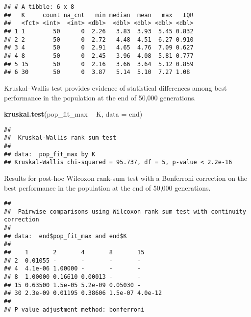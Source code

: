 \documentclass[]{book}
\newenvironment{Shaded}{\begin{snugshade}}{\end{snugshade}}
\newcommand{\DataTypeTok}[1]{\textcolor[rgb]{0.13,0.29,0.53}{#1}}
\newcommand{\KeywordTok}[1]{\textcolor[rgb]{0.13,0.29,0.53}{\textbf{#1}}}
\newcommand{\NormalTok}[1]{#1}
\newcommand{\OperatorTok}[1]{\textcolor[rgb]{0.81,0.36,0.00}{\textbf{#1}}}
\newcommand{\OtherTok}[1]{\textcolor[rgb]{0.56,0.35,0.01}{#1}}
\newcommand{\StringTok}[1]{\textcolor[rgb]{0.31,0.60,0.02}{#1}}
\begin{document}
\begin{verbatim}
## # A tibble: 6 x 8
##   K     count na_cnt   min median  mean   max   IQR
##   <fct> <int>  <int> <dbl>  <dbl> <dbl> <dbl> <dbl>
## 1 1        50      0  2.26   3.83  3.93  5.45 0.832
## 2 2        50      0  2.72   4.48  4.51  6.27 0.910
## 3 4        50      0  2.91   4.65  4.76  7.09 0.627
## 4 8        50      0  2.45   3.96  4.08  5.81 0.777
## 5 15       50      0  2.16   3.66  3.64  5.12 0.859
## 6 30       50      0  3.87   5.14  5.10  7.27 1.08
\end{verbatim}

Kruskal--Wallis test provides evidence of statistical differences among best performance in the population at the end of 50,000 generations.

\begin{Shaded}
\begin{Highlighting}[]
\KeywordTok{kruskal.test}\NormalTok{(pop_fit_max }\OperatorTok{~}\StringTok{ }\NormalTok{K, }\DataTypeTok{data =}\NormalTok{ end)}
\end{Highlighting}
\end{Shaded}

\begin{verbatim}
## 
##  Kruskal-Wallis rank sum test
## 
## data:  pop_fit_max by K
## Kruskal-Wallis chi-squared = 95.737, df = 5, p-value < 2.2e-16
\end{verbatim}

Results for post-hoc Wilcoxon rank-sum test with a Bonferroni correction on the best performance in the population at the end of 50,000 generations.

\begin{Shaded}
\end{Shaded}

\begin{verbatim}
## 
##  Pairwise comparisons using Wilcoxon rank sum test with continuity correction 
## 
## data:  end$pop_fit_max and end$K 
## 
##    1       2       4       8       15     
## 2  0.01055 -       -       -       -      
## 4  4.1e-06 1.00000 -       -       -      
## 8  1.00000 0.16610 0.00013 -       -      
## 15 0.63500 1.5e-05 5.2e-09 0.05030 -      
## 30 2.3e-09 0.01195 0.38606 1.5e-07 4.0e-12
## 
## P value adjustment method: bonferroni
\end{verbatim}
\end{document}
